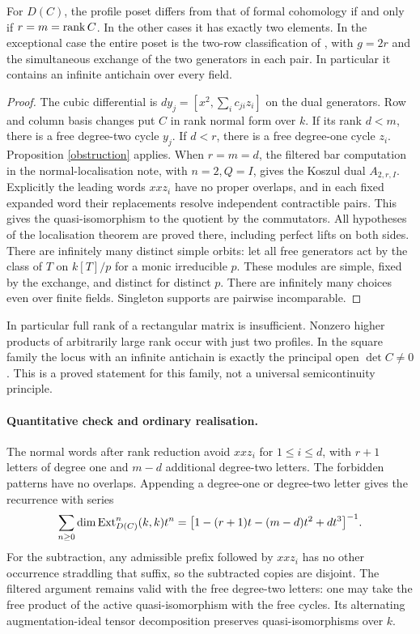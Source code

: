 \documentclass[11pt]{article}
\begin{document}
\begin{thm}\label{rank}
For $D(C)$, the profile poset differs from that of formal cohomology
if and only if $r=m=\operatorname{rank} C$. In the other cases it has exactly two
elements. In the exceptional case the entire poset is the two-row
classification of , with $g=2r$ and
the simultaneous exchange of the two generators in each pair.
In particular it contains an infinite antichain over every field.
\end{thm}
\begin{proof}
The cubic differential is $d y_j=[x^2,\sum_i c_{ji} z_i]$ on the dual
generators. Row and column basis changes put $C$ in rank normal form
over $k$. If its rank $d<m$, there is a free degree-two cycle $y_j$.
If $d<r$, there is a free degree-one cycle $z_i$. Proposition
\ref{obstruction} applies. When $r=m=d$, the filtered bar computation
in the normal-localisation note, with $n=2,Q=I$, gives the Koszul dual
$A_{2,r,I}$. Explicitly the leading words $xxz_i$ have no proper
overlaps, and in each fixed expanded word their replacements resolve
independent contractible pairs. This gives the quasi-isomorphism to
the quotient by the commutators. All hypotheses of the localisation
theorem are proved there, including perfect lifts on both sides.
There are infinitely many distinct simple orbits: let all free
generators act by the class of $T$ on $k[T]/p$ for a monic irreducible
$p$. These modules are simple, fixed by the exchange, and distinct
for distinct $p$. There are infinitely many choices even over finite
fields. Singleton supports are pairwise incomparable.
\end{proof}

In particular full rank of a rectangular matrix is insufficient. Nonzero
higher products of arbitrarily large rank occur with just two profiles.
In the square family the locus with an infinite antichain is exactly
the principal open $\det C\ne0$. This is a proved statement for this
family, not a universal semicontinuity principle.

\paragraph{Quantitative check and ordinary realisation.}
The normal words after rank reduction avoid $xxz_i$ for $1\le i\le d$,
with $r+1$ letters of degree one and $m-d$ additional degree-two letters.
The forbidden patterns have no overlaps. Appending a degree-one or
degree-two letter gives the recurrence with series
\[
 \sum_{n\ge0}\dim\operatorname{Ext}_{D(C)}^n(k,k)t^n
 =\big[1-(r+1)t-(m-d)t^2+d t^3\big]^{-1}.
\]
For the subtraction, any admissible prefix followed by $xxz_i$ has no
other occurrence straddling that suffix, so the subtracted copies
are disjoint. The filtered argument remains valid with the free
degree-two letters: one may take the free product of the active
quasi-isomorphism with the free cycles. Its alternating augmentation-ideal
tensor decomposition preserves quasi-isomorphisms over $k$.
\end{document}

